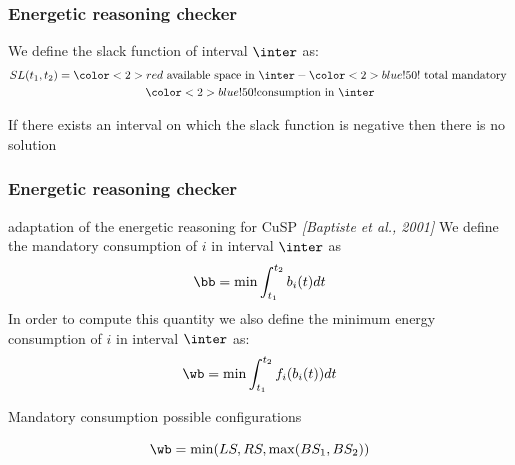 \begin{frame}
  \frametitle{Energetic reasoning checker}
  We define the  slack function of interval $\inter$ as:
  \begin{gather}
    SL(t_1,t_2)={\color<2>{red}\text{ available space in
      }\inter}-{\color<2>{blue!50!}\text{ total mandatory }} \nonumber\\ 
    {\color<2>{blue!50!}\text{consumption in } \inter}\nonumber
  \end{gather}
  \begin{theorem}
    If there exists an interval on which the slack function is negative then there is no solution
  \end{theorem}
  \vfill
\end{frame}

\begin{frame}
  \frametitle{Energetic reasoning checker}
  {\small adaptation of the energetic reasoning for CuSP {\color{gray!50!black!50} \it [Baptiste et al., 2001]}}
  \vfill
  We define the mandatory consumption of $i$ in interval $\inter$ as 
  \[\bb=\min \int_{t_1}^{t_2} b_i(t) dt\]
  \vfill
  In order to compute this quantity we also define the minimum energy
  consumption of $i$ in interval $\inter$ as:
  \[\wb=\min \int_{t_1}^{t_2} f_i(b_i(t)) dt\]
  \vfill
\end{frame}


\begin{frame}{Mandatory consumption possible configurations}
  
  \[\wb = \min ( LS, RS, \max (BS_1,BS_2))\]
\end{frame}

